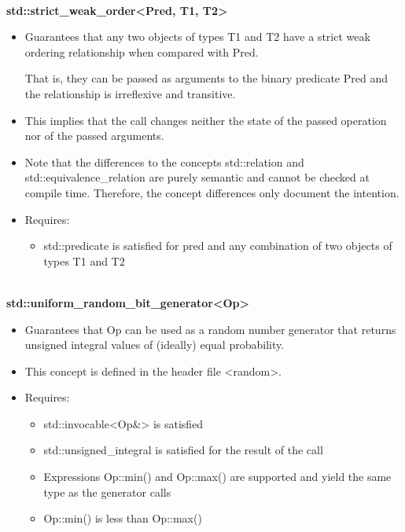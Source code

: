 \noindent
\hspace*{\fill} \\ %
\textbf{std::strict\_weak\_order<Pred, T1, T2>}

\begin{itemize}
\item
Guarantees that any two objects of types T1 and T2 have a strict weak ordering relationship when compared with Pred.

That is, they can be passed as arguments to the binary predicate Pred and the relationship is irreflexive and transitive.

\item
This implies that the call changes neither the state of the passed operation nor of the passed arguments.

\item
Note that the differences to the concepts std::relation and std::equivalence\_relation are purely semantic and cannot be checked at compile time. Therefore, the concept differences only document the intention.

\item
Requires:
\begin{itemize}
\item
std::predicate is satisfied for pred and any combination of two objects of types T1 and T2
\end{itemize}
\end{itemize}

\noindent
\hspace*{\fill} \\ %
\textbf{std::uniform\_random\_bit\_generator<Op>}

\begin{itemize}
\item
Guarantees that Op can be used as a random number generator that returns unsigned integral values of (ideally) equal probability.

\item
This concept is defined in the header file <random>.

\item
Requires:
\begin{itemize}
\item
std::invocable<Op\&> is satisfied

\item
std::unsigned\_integral is satisfied for the result of the call

\item
Expressions Op::min() and Op::max() are supported and yield the same type as the generator calls

\item
 Op::min() is less than Op::max()
\end{itemize}
\end{itemize}


